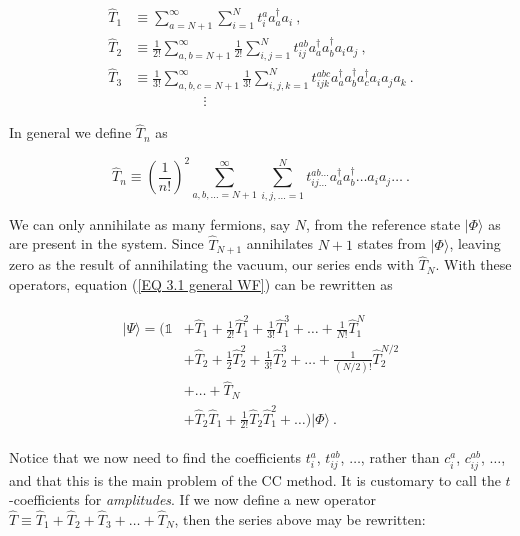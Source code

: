 	\begin{align}
		\hat{T}_1 &\equiv \sum_{a=N+1}^\infty\sum_{i=1}^Nt_i^a a_a^\dagger a_i \:,\\
		\hat{T}_2 &\equiv \frac{1}{2!}\sum_{a,b=N+1}^\infty\frac{1}{2!}\sum_{i,j=1}^Nt_{ij}^{ab} a_a^\dagger a_b^\dagger a_ ia_j \:,\\
		\hat{T}_3 &\equiv \frac{1}{3!}\sum_{a,b,c=N+1}^\infty\frac{1}{3!}\sum_{i,j,k=1}^Nt_{ijk}^{abc} a_a^\dagger a_b^\dagger a_c^\dagger a_ia_ja_k \:.\\
		&\quad\quad\quad\quad\quad\vdots
	\end{align}
	
	In general we define $\hat{T}_n$ as
	
	\begin{equation}
		\hat{T}_n \equiv \left(\frac{1}{n!}\right)^2\sum_{a,b,\ldots=N+1}^\infty\sum_{i,j,\ldots=1}^N t_{ij\ldots}^{ab\ldots} a_a^\dagger a_b^\dagger \ldots a_ia_j\ldots \:.
	\end{equation}
	
	We can only annihilate as many fermions, say $N$, from the reference state $|\Phi\rangle$ as are present in the system. Since $\hat{T}_{N+1}$ annihilates $N+1$ states from $|\Phi\rangle$, leaving zero as the result of annihilating the vacuum, our series ends with $\hat{T}_N$. With these operators, equation (\ref{EQ 3.1 general WF}) can be rewritten as
	
	\begin{align}
		\begin{split}
		|\Psi\rangle = \Big(\mathds{1} &+ \hat{T}_1 + \frac{1}{2!}\hat{T}_1^2 + \frac{1}{3!}\hat{T}_1^3 + \ldots + \frac{1}{N!}\hat{T}_1^N\\
		&+ \hat{T}_2 + \frac{1}{2}\hat{T}_2^2 + \frac{1}{3!}\hat{T}_2^3 + \ldots + \frac{1}{(N/2)!}\hat{T}_2^{N/2}\\
		&+ \ldots + \hat{T}_N \\
		&+ \hat{T}_2\hat{T}_1 + \frac{1}{2!}\hat{T}_2\hat{T}_1^2 + \ldots\Big)|\Phi\rangle \:.
		\end{split}
	\end{align}
	
	Notice that we now need to find the coefficients $t_i^a$, $t_{ij}^{ab}$, $\ldots$, rather than $c_i^a$, $c_{ij}^{ab}$, $\ldots$, and that this is the main problem of the CC method. It is customary to call the $t$-coefficients for \emph{amplitudes}. If we now define a new operator $\hat{T} \equiv \hat{T}_1 + \hat{T}_2 + \hat{T}_3 + \ldots + \hat{T}_N$, then the series above may be rewritten:
	

